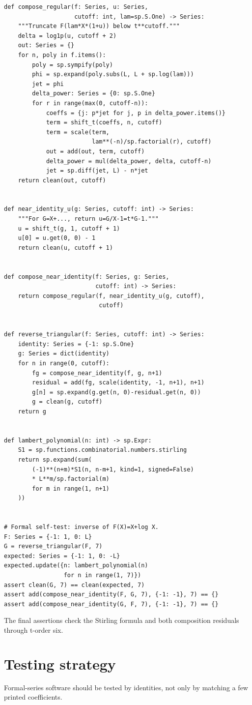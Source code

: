 \documentclass[11pt,openany]{book}
\theoremstyle{definition}
\theoremstyle{plain}
\theoremstyle{remark}
\begin{document}
\begin{lstlisting}[style=pythonstyle]
def compose_regular(f: Series, u: Series,
                    cutoff: int, lam=sp.S.One) -> Series:
    """Truncate F(lam*X*(1+u)) below t**cutoff."""
    delta = log1p(u, cutoff + 2)
    out: Series = {}
    for n, poly in f.items():
        poly = sp.sympify(poly)
        phi = sp.expand(poly.subs(L, L + sp.log(lam)))
        jet = phi
        delta_power: Series = {0: sp.S.One}
        for r in range(max(0, cutoff-n)):
            coeffs = {j: p*jet for j, p in delta_power.items()}
            term = shift_t(coeffs, n, cutoff)
            term = scale(term,
                         lam**(-n)/sp.factorial(r), cutoff)
            out = add(out, term, cutoff)
            delta_power = mul(delta_power, delta, cutoff-n)
            jet = sp.diff(jet, L) - n*jet
    return clean(out, cutoff)


def near_identity_u(g: Series, cutoff: int) -> Series:
    """For G=X+..., return u=G/X-1=t*G-1."""
    u = shift_t(g, 1, cutoff + 1)
    u[0] = u.get(0, 0) - 1
    return clean(u, cutoff + 1)


def compose_near_identity(f: Series, g: Series,
                          cutoff: int) -> Series:
    return compose_regular(f, near_identity_u(g, cutoff),
                           cutoff)


def reverse_triangular(f: Series, cutoff: int) -> Series:
    identity: Series = {-1: sp.S.One}
    g: Series = dict(identity)
    for n in range(0, cutoff):
        fg = compose_near_identity(f, g, n+1)
        residual = add(fg, scale(identity, -1, n+1), n+1)
        g[n] = sp.expand(g.get(n, 0)-residual.get(n, 0))
        g = clean(g, cutoff)
    return g


def lambert_polynomial(n: int) -> sp.Expr:
    S1 = sp.functions.combinatorial.numbers.stirling
    return sp.expand(sum(
        (-1)**(n+m)*S1(n, n-m+1, kind=1, signed=False)
        * L**m/sp.factorial(m)
        for m in range(1, n+1)
    ))


# Formal self-test: inverse of F(X)=X+log X.
F: Series = {-1: 1, 0: L}
G = reverse_triangular(F, 7)
expected: Series = {-1: 1, 0: -L}
expected.update({n: lambert_polynomial(n)
                 for n in range(1, 7)})
assert clean(G, 7) == clean(expected, 7)
assert add(compose_near_identity(F, G, 7), {-1: -1}, 7) == {}
assert add(compose_near_identity(G, F, 7), {-1: -1}, 7) == {}
\end{lstlisting}
The final assertions check the Stirling formula and both composition residuals
through t-order six.

\section{Testing strategy}
Formal-series software should be tested by identities, not only by matching a
few printed coefficients.
\end{document}
